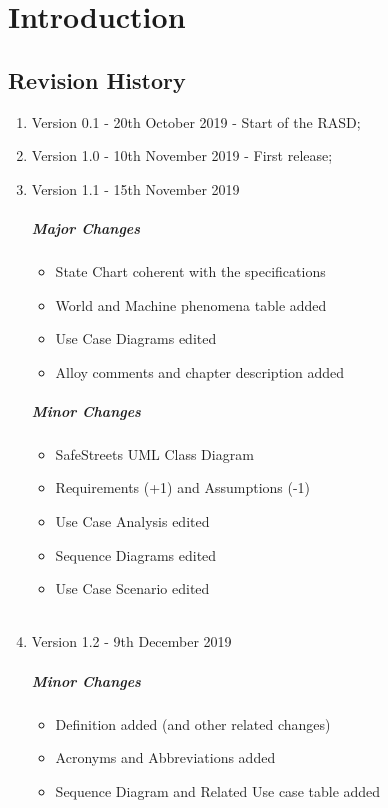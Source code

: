 \documentclass[../RASD.tex]{subfiles}
\begin{document}
\chapter{Introduction}
\thispagestyle{fancy}
		
		
		
		
	
		\section{Revision History}
		\begin{enumerate}
			\item Version 0.1 - 20th October 2019 - Start of the RASD;
			\item Version 1.0 - 10th November 2019 - First release;\\
			
			\item Version 1.1 - 15th November 2019
				\paragraph{Major Changes}
				\begin{itemize}
					\item {} State Chart coherent with the specifications 
					\item World and Machine phenomena table added
					\item Use Case Diagrams edited
					\item Alloy comments and chapter description added
				\end{itemize}
				\paragraph{Minor Changes}
				\begin{itemize}
					\item SafeStreets UML Class Diagram
					\item Requirements (+1) and Assumptions (-1)
					\item Use Case Analysis edited
					\item Sequence Diagrams edited
					\item Use Case Scenario edited\\\\
				\end{itemize}
			
			\item Version 1.2 - 9th December 2019
				\paragraph{Minor Changes}
				\begin{itemize}
					\item Definition added (and other related changes)
					\item Acronyms and Abbreviations added
					\item Sequence Diagram and Related Use case table added
				\end{itemize}
		\end{enumerate}
	
\end{document}
